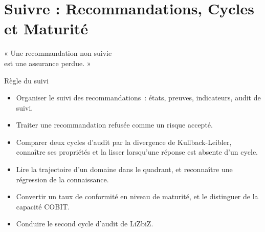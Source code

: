 
\chapter[Suivre]{Suivre : Recommandations, Cycles et Maturité}
\label{chap:suivi}

\epigraph{%
    « Une recommandation non suivie\\
    est une assurance perdue. »%
}{Règle du suivi}


\begin{boxobjectifs}
\begin{itemize}
    \item Organiser le suivi des recommandations~: états, preuves,
          indicateurs, audit de suivi.
    \item Traiter une recommandation refusée comme un risque accepté.
    \item Comparer deux cycles d'audit par la divergence de
          Kullback-Leibler, connaître ses propriétés et la lisser lorsqu'une
          réponse est absente d'un cycle.
    \item Lire la trajectoire d'un domaine dans le quadrant, et reconnaître
          une régression de la connaissance.
    \item Convertir un taux de conformité en niveau de maturité, et le
          distinguer de la capacité COBIT.
    \item Conduire le second cycle d'audit de LiZbiZ.
\end{itemize}
\end{boxobjectifs}

